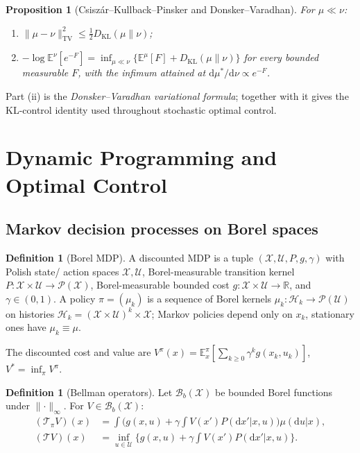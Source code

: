 \documentclass[11pt,letterpaper]{article}
\theoremstyle{plain}
\newtheorem{proposition}[theorem]{Proposition}
\theoremstyle{definition}
\newtheorem{definition}[theorem]{Definition}
\theoremstyle{remark}
\newcommand{\R}{\mathbb{R}}
\newcommand{\E}{\mathbb{E}}
\newcommand{\dd}{\mathrm{d}}
\newcommand{\KL}{D_{\mathrm{KL}}}
\newcommand{\calB}{\mathcal{B}}
\newcommand{\calP}{\mathcal{P}}
\newcommand{\calT}{\mathcal{T}}
\newcommand{\calU}{\mathcal{U}}
\newcommand{\calX}{\mathcal{X}}
\newcommand{\calH}{\mathcal{H}}
\newcommand{\norm}[1]{\lVert #1\rVert}
\begin{document}
\begin{proposition}[Csisz\'ar--Kullback--Pinsker and Donsker--Varadhan]\label{prop:ckp-dv}
For $\mu\ll\nu$:
\begin{enumerate}[leftmargin=*,itemsep=1pt]
  \item $\lVert\mu-\nu\rVert_{\mathrm{TV}}^2\le\tfrac12\KL(\mu\|\nu)$;
  \item $-\log\E^\nu[e^{-F}]=\inf_{\mu\ll\nu}\{\E^\mu[F]+\KL(\mu\|\nu)\}$
        for every bounded measurable $F$, with the infimum attained at
        $\dd\mu^*/\dd\nu\propto e^{-F}$.
\end{enumerate}
\end{proposition}

Part (ii) is the \emph{Donsker--Varadhan variational formula}; together
with  it gives the KL-control identity used throughout
stochastic optimal control.

\section{Dynamic Programming and Optimal Control}\label{app:dp}

\subsection{Markov decision processes on Borel spaces}

\begin{definition}[Borel MDP]\label{def:mdp}
A discounted MDP is a tuple $(\calX,\calU,P,g,\gamma)$ with Polish state/
action spaces $\calX,\calU$, Borel-measurable transition kernel
$P:\calX\times\calU\to\calP(\calX)$, Borel-measurable bounded cost
$g:\calX\times\calU\to\R$, and $\gamma\in(0,1)$.
A policy $\pi=(\mu_k)$ is a sequence of Borel kernels
$\mu_k:\calH_k\to\calP(\calU)$ on histories
$\calH_k=(\calX\times\calU)^k\times\calX$; Markov policies depend only on
$x_k$, stationary ones have $\mu_k\equiv\mu$.
\end{definition}

The discounted cost and value are
$V^\pi(x)=\E^\pi_x[\sum_{k\ge 0}\gamma^k g(x_k,u_k)]$, $V^*=\inf_\pi V^\pi$.

\begin{definition}[Bellman operators]
Let $\calB_b(\calX)$ be bounded Borel functions under $\norm{\cdot}_\infty$.
For $V\in\calB_b(\calX)$:
\begin{align}
  (\calT_\pi V)(x)&=\int\bigl(g(x,u)+\gamma\!\int V(x')P(\dd x'|x,u)\bigr)\mu(\dd u|x),\\
  (\calT V)(x) &=\inf_{u\in\calU}\{g(x,u)+\gamma\!\int V(x')P(\dd x'|x,u)\}.
\end{align}
\end{definition}
\end{document}
